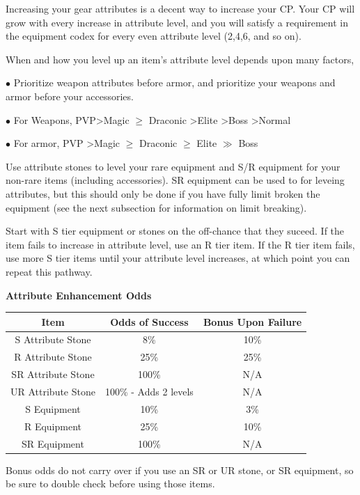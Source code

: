 \documentclass[]{article}
\begin{document}
Increasing your gear attributes is a decent way to increase your CP.
Your CP will grow with every increase in attribute level, and you will satisfy a requirement in the equipment codex for every even attribute level (2,4,6, and so on).

When and how you level up an item's attribute level depends upon many factors,

$\bullet$ Prioritize weapon attributes before armor, and prioritize your weapons and armor before your accessories.

$\bullet$ For Weapons, PVP\textgreater Magic $\ge$ Draconic \textgreater Elite \textgreater Boss \textgreater Normal

$\bullet$ For armor, PVP \textgreater Magic $\ge$ Draconic $\ge$ Elite $\gg$ Boss

Use attribute stones to level your rare equipment and S/R equipment for your non-rare items (including accessories).
SR equipment can be used to for leveing attributes, but this should only be done if you have fully limit broken the equipment (see the next subsection for information on limit breaking).

Start with S tier equipment or stones on the off-chance that they suceed.
If the item fails to increase in attribute level, use an R tier item.
If the R tier item fails, use more S tier items until your attribute level increases, at which point you can repeat this pathway.

\pagebreak
\begin{center}
	\textbf{Attribute Enhancement Odds}\\
\begin{tabular}{|c|c|c|}
	\hline 
	Item & Odds of Success & Bonus Upon Failure \\ 	\hline 
	S Attribute Stone & 8\% & 10\% \\ 	 
	R Attribute Stone & 25\% & 25\% \\ 	 
	SR Attribute Stone & 100\% & N/A \\ 	 
	UR Attribute Stone & 100\% - Adds 2 levels & N/A \\ 	 
	S Equipment & 10\% & 3\% \\ 	 
	R Equipment & 25\% & 10\% \\ 	 
	SR Equipment & 100\% & N/A \\ 	\hline 
\end{tabular} 
\end{center}

Bonus odds do not carry over if you use an SR or UR stone, or SR equipment, so be sure to double check before using those items.
\end{document}

